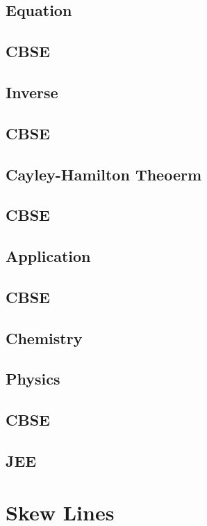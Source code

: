 \documentclass[journal]{IEEEtran}
\begin{document}
\subsection{Equation}

\subsection{CBSE}

\subsection{Inverse}

\subsection{CBSE}

\subsection{Cayley-Hamilton Theoerm}

\subsection{CBSE}

\subsection{Application}

\subsection{CBSE}

\subsection{Chemistry}

\subsection{Physics}

\subsection{CBSE}

\subsection{JEE}

\newpage
\section{Skew Lines}
\end{document}

